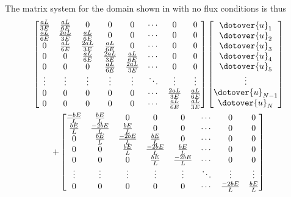 The matrix system for the domain shown in  with no flux conditions is thus
\begin{multline}
  \begin{bmatrix}
    \frac{aL}{3E} & \frac{aL}{6E} & 0 & 0 & 0 & \cdots & 0 & 0 \\
    \frac{aL}{6E} & \frac{2aL}{3E} &  \frac{aL}{6E} & 0 & 0 & \cdots & 0 & 0 \\
    0 & \frac{aL}{6E} & \frac{2aL}{3E} &  \frac{aL}{6E} & 0 & \cdots & 0 & 0 \\
    0 & 0 & \frac{aL}{6E} & \frac{2aL}{3E} &  \frac{aL}{6E} & \cdots & 0 & 0 \\
    0 & 0 & 0 & \frac{aL}{6E} & \frac{2aL}{3E} & \cdots & 0 & 0 \\
    \vdots & \vdots & \vdots & \vdots & \vdots & \ddots & \vdots & \vdots \\
    0 & 0 & 0 & 0 & 0 & \cdots & \frac{2aL}{3E} & \frac{aL}{6E} \\
    0 & 0 & 0 & 0 & 0 & \cdots & \frac{aL}{6E} & \frac{aL}{3E} \\
  \end{bmatrix} \begin{bmatrix}
    \dotover{u}_{1} \\
    \dotover{u}_{2} \\
    \dotover{u}_{3} \\
    \dotover{u}_{4} \\
    \dotover{u}_{5} \\
    \vdots \\
    \dotover{u}_{N-1} \\
    \dotover{u}_{N} \\
  \end{bmatrix} \\
  + \begin{bmatrix}
    \frac{-bE}{L} & \frac{bE}{L} & 0 & 0 & 0 & \cdots & 0 & 0 \\
    \frac{bE}{L} & \frac{-2bE}{L} &  \frac{bE}{L} & 0 & 0 & \cdots & 0 & 0 \\
    0 & \frac{bE}{L} & \frac{-2bE}{L} &  \frac{bE}{L} & 0 & \cdots & 0 & 0 \\
    0 & 0 & \frac{bE}{L} & \frac{-2bE}{L} &  \frac{bE}{L} & \cdots & 0 & 0 \\
    0 & 0 & 0 & \frac{bE}{L} & \frac{-2bE}{L} & \cdots & 0 & 0 \\
    \vdots & \vdots & \vdots & \vdots & \vdots & \ddots & \vdots & \vdots \\
    0 & 0 & 0 & 0 & 0 & \cdots & \frac{-2bE}{L} & \frac{bE}{L} \\

\end{bmatrix}
\end{multline}
